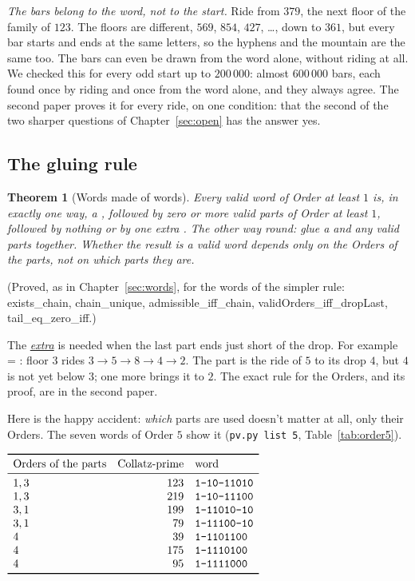 \documentclass[10pt,a4paper,titlepage]{article}
\makeatletter
\newcommand{\termhere}[1]{\leavevmode
  \Hy@raisedlink{\hyper@anchorstart{term:#1}\hyper@anchorend}}
\newcommand{\keyterm}[2]{\hyperlink{box:#1}{\emph{#2}}}
\newcommand{\lean}[1]{\textsf{#1}}
\newcommand{\pv}[1]{\texttt{pv.py #1}}
\newtheorem{theorem}{Theorem}
\makeatother
\begin{document}
\emph{The bars belong to the word, not to the start.} Ride from $379$, the next floor
of the family of $123$. The floors are different, $569$, $854$, $427$, \dots, down
to $361$, but every bar starts and ends at the same letters, so the hyphens and the
mountain are the same too. The bars can even be drawn from the word alone, without
riding at all. We checked this for every odd start up to $200\,000$: almost
$600\,000$ bars, each found once by riding and once from the word alone, and they
always agree. The second paper proves it for every ride, on one condition: that the
second of the two sharper questions of Chapter~\ref{sec:open} has the answer yes.

\subsection*{The gluing rule}

\begin{theorem}[Words made of words]
\label{thm:chain}
Every valid word of Order at least $1$ is, in exactly one way, a , followed by
zero or more valid parts of Order at least $1$, followed by nothing or by one extra .
The other way round: glue a  and any valid parts together. Whether the result is
a valid word depends only on the Orders of the parts, not on which parts they are.
\end{theorem}
(Proved, as in Chapter~\ref{sec:words}, for the words of the simpler rule:
\lean{exists\_chain}, \lean{chain\_unique}, \lean{admissible\_iff\_chain},
\lean{validOrders\_iff\_dropLast}, \lean{tail\_eq\_zero\_iff}.)

\medskip
\termhere{extra0}The \keyterm{extra0}{extra}  is needed when the last part ends just short of the drop. For example
 = : floor $3$ rides $3 \to 5 \to 8 \to 4 \to 2$. The part  is the
ride of $5$ to its drop $4$, but $4$ is not yet below $3$; one more  brings it to
$2$. The exact rule for the Orders, and its proof, are in the second paper.

\nopagebreak
Here is the happy accident: \emph{which} parts are used doesn't matter at all, only
their Orders. The seven words of Order $5$ show it (\pv{list 5}, Table~\ref{tab:order5}).

\begin{table}[htbp]
\centering
$\begin{array}{l r l}
\toprule
\text{Orders of the parts} & \text{Collatz-prime} & \text{word} \\
\midrule
1, 3 & 123 & \bw{1-10-11010} \\
1, 3 & 219 & \bw{1-10-11100} \\
3, 1 & 199 & \bw{1-11010-10} \\
3, 1 & 79 & \bw{1-11100-10} \\
4 & 39 & \bw{1-1101100} \\
4 & 175 & \bw{1-1110100} \\
4 & 95 & \bw{1-1111000} \\
\bottomrule
\end{array}$
\caption{The seven valid words of Order $5$, cut into parts, grouped by the Orders of their
parts.}
\label{tab:order5}
\end{table}
\end{document}
